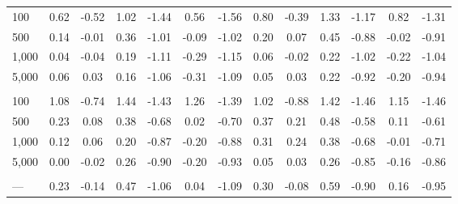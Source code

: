 \documentclass[AMA,STIX1COL,doublespace]{WileyNJD-v2}
\begin{document}
\begin{table}
\begin{tabular}[t]{lcccccccccccc}
\hline
\hspace{1em}100 & 0.62 & -0.52 & 1.02 & -1.44 & 0.56 & -1.56 & 0.80 & -0.39 & 1.33 & -1.17 & 0.82 & -1.31\\
\hspace{1em}500 & 0.14 & -0.01 & 0.36 & -1.01 & -0.09 & -1.02 & 0.20 & 0.07 & 0.45 & -0.88 & -0.02 & -0.91\\
\hspace{1em}1,000 & 0.04 & -0.04 & 0.19 & -1.11 & -0.29 & -1.15 & 0.06 & -0.02 & 0.22 & -1.02 & -0.22 & -1.04\\
\hspace{1em}5,000 & 0.06 & 0.03 & 0.16 & -1.06 & -0.31 & -1.09 & 0.05 & 0.03 & 0.22 & -0.92 & -0.20 & -0.94\\
\addlinespace[0.75em]
\multicolumn{13}{l}{\textbf{10 predictors, 490 junk}}\\
\hline
\hspace{1em}100 & 1.08 & -0.74 & 1.44 & -1.43 & 1.26 & -1.39 & 1.02 & -0.88 & 1.42 & -1.46 & 1.15 & -1.46\\
\hspace{1em}500 & 0.23 & 0.08 & 0.38 & -0.68 & 0.02 & -0.70 & 0.37 & 0.21 & 0.48 & -0.58 & 0.11 & -0.61\\
\hspace{1em}1,000 & 0.12 & 0.06 & 0.20 & -0.87 & -0.20 & -0.88 & 0.31 & 0.24 & 0.38 & -0.68 & -0.01 & -0.71\\
\hspace{1em}5,000 & 0.00 & -0.02 & 0.26 & -0.90 & -0.20 & -0.93 & 0.05 & 0.03 & 0.26 & -0.85 & -0.16 & -0.86\\
\addlinespace[0.75em]
\multicolumn{13}{l}{\textbf{Overall}}\\
\hline
\hspace{1em}--- & 0.23 & -0.14 & 0.47 & -1.06 & 0.04 & -1.09 & 0.30 & -0.08 & 0.59 & -0.90 & 0.16 & -0.95\\
\bottomrule
\end{tabular}
\end{table}
\end{document}
